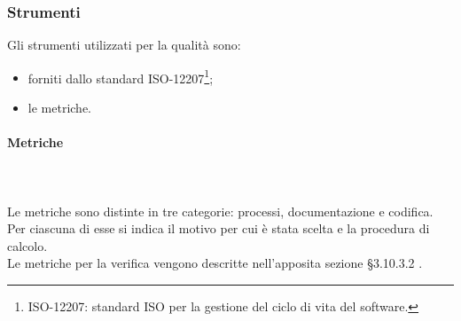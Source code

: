 \subsubsection{Strumenti}
Gli strumenti utilizzati per la qualità sono:
\begin{itemize}
\item forniti dallo standard ISO-12207\footnote{ISO-12207: standard ISO per la gestione del ciclo di vita del software.};
\item le metriche.
\end{itemize}
\pagebreak
\paragraph{Metriche} \mbox{} \\ \mbox{} \\
Le metriche sono distinte in tre categorie: processi, documentazione e codifica. Per ciascuna di esse si indica il motivo per cui è stata scelta e la procedura di calcolo. \\
Le metriche per la verifica vengono descritte nell'apposita sezione \S 3.10.3.2 .

